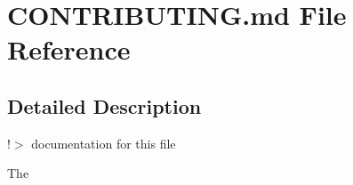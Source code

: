 \hypertarget{CONTRIBUTING_8md}{}\section{C\+O\+N\+T\+R\+I\+B\+U\+T\+I\+N\+G.\+md File Reference}
\label{CONTRIBUTING_8md}


\subsection{Detailed Description}
!$>$ documentation for this file

The \textquotesingle{} 